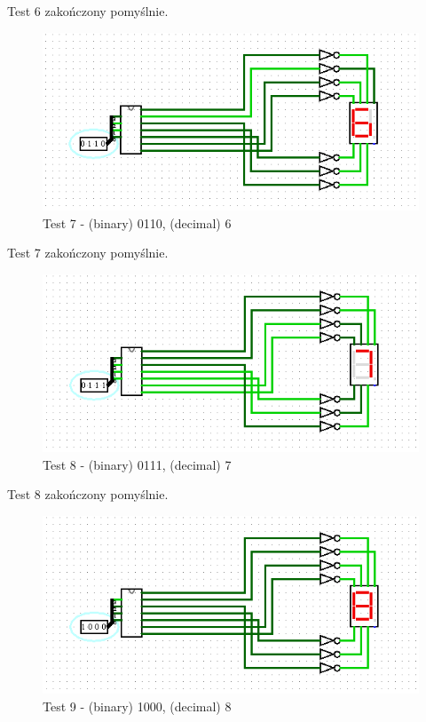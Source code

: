 Test 6 zakończony pomyślnie.

\begin{figure}[H]
    \includegraphics[width=\linewidth]{ScreenshotsTests/Comp 1/Comp 1_00003.png}
    \caption{Test 7 - (binary) 0110, (decimal) 6}
    \label{fig:test6}
\end{figure}

Test 7 zakończony pomyślnie.

\begin{figure}[H]
    \includegraphics[width=\linewidth]{ScreenshotsTests/Comp 1/Comp 1_00002.png}
    \caption{Test 8 - (binary) 0111, (decimal) 7}
    \label{fig:test7}
\end{figure}

Test 8 zakończony pomyślnie.

\begin{figure}[H]
    \includegraphics[width=\linewidth]{ScreenshotsTests/Comp 1/Comp 1_00001.png}
    \caption{Test 9 - (binary) 1000, (decimal) 8}
    \label{fig:test8}
\end{figure}

